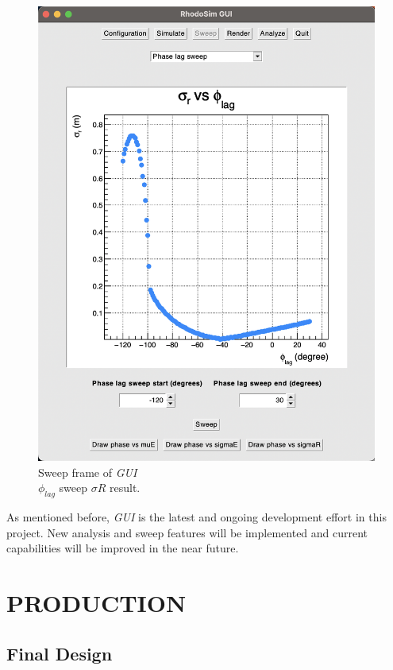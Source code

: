 \documentclass[a4paper,oneside,12pt]{report}
\numberwithin{equation}{chapter}
\begin{document}
\begin{figure}
    \centering
    \includegraphics[width=0.8\linewidth]{./figures/rhodoSim/GUI_sweep_sR.png}
    \caption{Sweep frame of \textit{GUI} \\ $\phi_{lag}$ sweep $\sigma R$ result.}
    \label{fig:gui_sweep_sR}
\end{figure}
As mentioned before, \textit{GUI} is the latest and ongoing development effort in this project.
New analysis and sweep features will be implemented and current capabilities will be improved in the near future.



\newpage


\chapter{PRODUCTION}
\section{Final Design} \label{sec:final_design}
\end{document}
